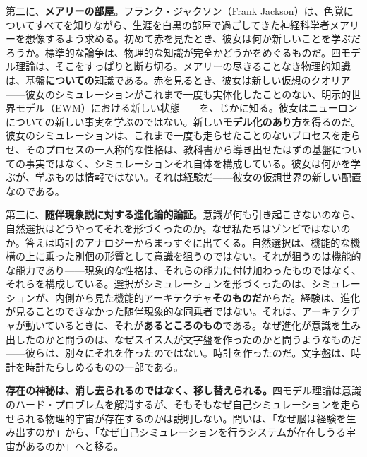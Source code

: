 \documentclass[11pt, twoside, openright]{book}
\begin{document}
第二に、\textbf{メアリーの部屋}。フランク・ジャクソン（Frank Jackson）は、色覚についてすべてを知りながら、生涯を白黒の部屋で過ごしてきた神経科学者メアリーを想像するよう求める。初めて赤を見たとき、彼女は何か新しいことを学ぶだろうか。標準的な論争は、物理的な知識が完全かどうかをめぐるものだ。四モデル理論は、そこをすっぱりと断ち切る。メアリーの尽きることなき物理的知識は、基盤\textbf{についての}知識である。赤を見るとき、彼女は新しい仮想のクオリア------彼女のシミュレーションがこれまで一度も実体化したことのない、明示的世界モデル（EWM）における新しい状態------を、じかに知る。彼女はニューロンについての新しい事実を学ぶのではない。新しい\textbf{モデル化のあり方}を得るのだ。彼女のシミュレーションは、これまで一度も走らせたことのないプロセスを走らせ、そのプロセスの一人称的な性格は、教科書から導き出せたはずの基盤についての事実ではなく、シミュレーションそれ自体を構成している。彼女は何かを学ぶが、学ぶものは情報ではない。それは経験だ------彼女の仮想世界の新しい配置なのである。

第三に、\textbf{随伴現象説に対する進化論的論証}。意識が何も引き起こさないのなら、自然選択はどうやってそれを形づくったのか。なぜ私たちはゾンビではないのか。答えは時計のアナロジーからまっすぐに出てくる。自然選択は、機能的な機構の上に乗った別個の形質として意識を狙うのではない。それが狙うのは機能的な能力であり------現象的な性格は、それらの能力に付け加わったものではなく、それらを構成している。選択がシミュレーションを形づくったのは、シミュレーションが、内側から見た機能的アーキテクチャ\textbf{そのものだ}からだ。経験は、進化が見ることのできなかった随伴現象的な同乗者ではない。それは、アーキテクチャが動いているときに、それが\textbf{あるところのもの}である。なぜ進化が意識を生み出したのかと問うのは、なぜスイス人が文字盤を作ったのかと問うようなものだ------彼らは、別々にそれを作ったのではない。時計を作ったのだ。文字盤は、時計を時計たらしめるものの一部である。

\textbf{存在の神秘は、消し去られるのではなく、移し替えられる。}四モデル理論は意識のハード・プロブレムを解消するが、そもそもなぜ自己シミュレーションを走らせられる物理的宇宙が存在するのかは説明しない。問いは、「なぜ脳は経験を生み出すのか」から、「なぜ自己シミュレーションを行うシステムが存在しうる宇宙があるのか」へと移る。
\end{document}
